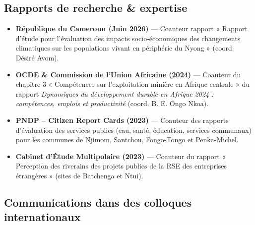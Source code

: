 \documentclass[
  french,
  10pt,
  letterpaper,
  DIV=11,
  numbers=noendperiod]{scrartcl}
\providecommand{\tightlist}{%
  \setlength{\itemsep}{0pt}\setlength{\parskip}{0pt}}
\begin{document}
\subsection{Rapports de recherche \&
expertise}\label{rapports-de-recherche-expertise}

\begin{itemize}
\tightlist
\item
  \textbf{République du Cameroun (Juin 2026)} --- Coauteur rapport «
  Rapport d'étude pour l'évaluation des impacts socio-économiques des
  changements climatiques sur les populations vivant en périphérie du
  Nyong » (coord. Désiré Avom).
\item
  \textbf{OCDE \& Commission de l'Union Africaine (2024)} --- Coauteur
  du chapitre 3 « Compétences sur l'exploitation minière en Afrique
  centrale » du rapport
  \textit{Dynamiques du développement durable en Afrique 2024 : compétences, emplois et productivité}
  (coord. B. E. Ongo Nkoa).
\item
  \textbf{PNDP -- Citizen Report Cards (2023)} --- Coauteur des rapports
  d'évaluation des services publics (eau, santé, éducation, services
  communaux) pour les communes de Njimom, Santchou, Fongo-Tongo et
  Penka-Michel.
\item
  \textbf{Cabinet d'Étude Multipolaire (2023)} --- Coauteur du rapport «
  Perception des riverains des projets publics de la RSE des entreprises
  étrangères » (sites de Batchenga et Ntui).
\end{itemize}

\subsection{Communications dans des colloques
internationaux}\label{communications-dans-des-colloques-internationaux}
\end{document}
